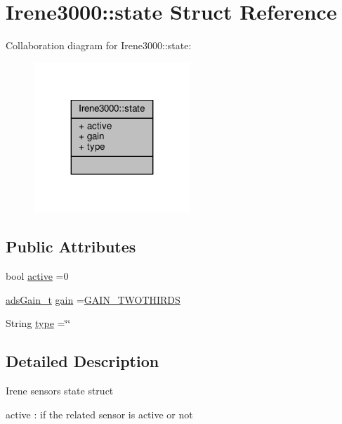\hypertarget{struct_irene3000_1_1state}{}\section{Irene3000\+:\+:state Struct Reference}
\label{struct_irene3000_1_1state}


Collaboration diagram for Irene3000\+:\+:state\+:
\nopagebreak
\begin{figure}[H]
\begin{center}
\leavevmode
\includegraphics[width=167pt]{struct_irene3000_1_1state__coll__graph}
\end{center}
\end{figure}
\subsection*{Public Attributes}
\begin{DoxyCompactItemize}
\item 
bool \hyperlink{struct_irene3000_1_1state_a879828ace7e7a7bc91ff703bfee36599}{active} =0
\item 
\hyperlink{_cool_adafruit___a_d_s1015_8h_a3d6c0e15829a207b9155890811fa4781}{ads\+Gain\+\_\+t} \hyperlink{struct_irene3000_1_1state_a1ecf69d38cb31ecaf6b3602a3f3e93cb}{gain} =\hyperlink{_cool_adafruit___a_d_s1015_8h_a3d6c0e15829a207b9155890811fa4781a879d688347ec0bf159fe1278db602f68}{G\+A\+I\+N\+\_\+\+T\+W\+O\+T\+H\+I\+R\+DS}
\item 
String \hyperlink{struct_irene3000_1_1state_a9897a7e02727db6351d44006eec73799}{type} =\char`\"{}\char`\"{}
\end{DoxyCompactItemize}


\subsection{Detailed Description}
Irene sensors state struct

active \+: if the related sensor is active or not

